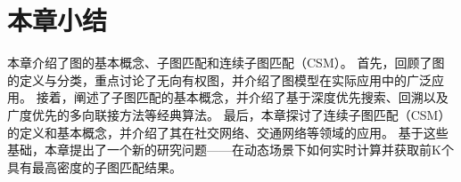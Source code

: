 \section{本章小结}
本章介绍了图的基本概念、子图匹配和连续子图匹配（CSM）。
首先，回顾了图的定义与分类，重点讨论了无向有权图，并介绍了图模型在实际应用中的广泛应用。
接着，阐述了子图匹配的基本概念，并介绍了基于深度优先搜索、回溯以及广度优先的多向联接方法等经典算法。
最后，本章探讨了连续子图匹配（CSM）的定义和基本概念，并介绍了其在社交网络、交通网络等领域的应用。
基于这些基础，本章提出了一个新的研究问题——在动态场景下如何实时计算并获取前K个具有最高密度的子图匹配结果。